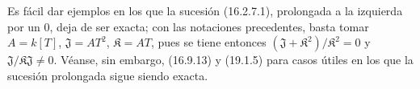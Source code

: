 Es fácil dar ejemplos en los que la sucesión (16.2.7.1), prolongada a la izquierda
por un 0, deja de ser exacta; con las notaciones precedentes, basta
tomar $A=k[T]$, $\mathfrak{J}=AT^2$, $\mathfrak{K}=AT$, pues se tiene entonces
$(\mathfrak{J}+\mathfrak{K}^2)/\mathfrak{K}^2=0$ y
$\mathfrak{J}/\mathfrak{K}\mathfrak{J}\neq 0$. Véanse, sin embargo, (16.9.13) y
(19.1.5) para casos útiles en los que la sucesión prolongada sigue siendo exacta.
